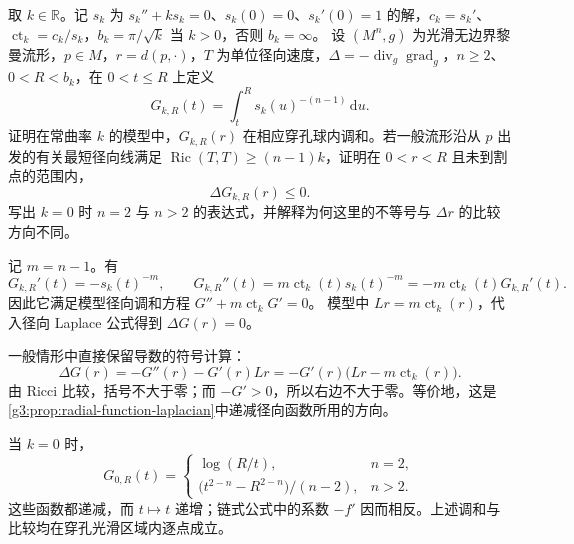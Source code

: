 \begin{exercise}\label{g3:ex:model-radial-harmonic-comparison}
	取 \(k\in\mathbb R\)。记 \(s_k\) 为 \(s_k''+ks_k=0\)、\(s_k(0)=0\)、\(s_k'(0)=1\) 的解，\(c_k=s_k'\)、\(\operatorname{ct}_k=c_k/s_k\)，\(b_k=\pi/\sqrt k\) 当 \(k>0\)，否则 \(b_k=\infty\)。
	设 \((M^n,g)\) 为光滑无边界黎曼流形，\(p\in M\)，\(r=d(p,\cdot)\)，\(T\) 为单位径向速度，\(\Delta=-\operatorname{div}_g\operatorname{grad}_g\)，\(n\ge2\)、\(0<R<b_k\)，在 \(0<t\le R\) 上定义
	\[
		G_{k,R}(t)=\int_t^R s_k(u)^{-(n-1)}\,\mathrm du.
	\]
	证明在常曲率 \(k\) 的模型中，\(G_{k,R}(r)\) 在相应穿孔球内调和。若一般流形沿从 \(p\) 出发的有关最短径向线满足
	\(\operatorname{Ric}(T,T)\ge(n-1)k\)，证明在
	\(0<r<R\) 且未到割点的范围内，
	\[
		\Delta G_{k,R}(r)\le0.
	\]
	写出 \(k=0\) 时 \(n=2\) 与 \(n>2\) 的表达式，并解释为何这里的不等号与 \(\Delta r\) 的比较方向不同。
\end{exercise}
\begin{solution}
	记 \(m=n-1\)。有
	\[
		G_{k,R}'(t)=-s_k(t)^{-m},\qquad
		G_{k,R}''(t)
		=m\operatorname{ct}_k(t)s_k(t)^{-m}
		=-m\operatorname{ct}_k(t)G_{k,R}'(t).
	\]
	因此它满足模型径向调和方程
	\(G''+m\operatorname{ct}_kG'=0\)。
	模型中 \(Lr=m\operatorname{ct}_k(r)\)，代入径向 Laplace 公式得到 \(\Delta G(r)=0\)。

	一般情形中直接保留导数的符号计算：
	\[
		\Delta G(r)
		=-G''(r)-G'(r)Lr
		=-G'(r)\bigl(Lr-m\operatorname{ct}_k(r)\bigr).
	\]
	由 Ricci 比较，括号不大于零；而 \(-G'>0\)，所以右边不大于零。等价地，这是\cref{g3:prop:radial-function-laplacian}中递减径向函数所用的方向。

	当 \(k=0\) 时，
	\[
		G_{0,R}(t)=
		\begin{cases}
			\log(R/t),&n=2,\\
			\bigl(t^{2-n}-R^{2-n}\bigr)/(n-2),&n>2.
		\end{cases}
	\]
	这些函数都递减，而 \(t\mapsto t\) 递增；链式公式中的系数 \(-f'\) 因而相反。上述调和与比较均在穿孔光滑区域内逐点成立。
\end{solution}

